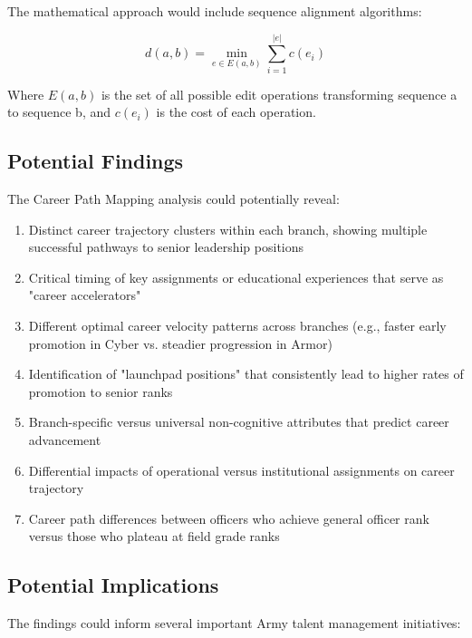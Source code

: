 \documentclass{article}
\begin{document}
The mathematical approach would include sequence alignment algorithms:

\[ d(a,b) = \min_{e \in E(a,b)} \sum_{i=1}^{|e|} c(e_i) \]

Where \(E(a,b)\) is the set of all possible edit operations transforming sequence a to sequence b, and \(c(e_i)\) is the cost of each operation.

\subsection{Potential Findings}
The Career Path Mapping analysis could potentially reveal:

\begin{enumerate}
\item Distinct career trajectory clusters within each branch, showing multiple successful pathways to senior leadership positions
\item Critical timing of key assignments or educational experiences that serve as "career accelerators"
\item Different optimal career velocity patterns across branches (e.g., faster early promotion in Cyber vs. steadier progression in Armor)
\item Identification of "launchpad positions" that consistently lead to higher rates of promotion to senior ranks
\item Branch-specific versus universal non-cognitive attributes that predict career advancement
\item Differential impacts of operational versus institutional assignments on career trajectory
\item Career path differences between officers who achieve general officer rank versus those who plateau at field grade ranks
\end{enumerate}

\subsection{Potential Implications}
The findings could inform several important Army talent management initiatives:
\end{document}
